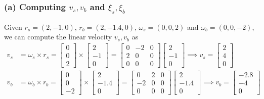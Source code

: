\subsubsection*{(a) Computing \( v_{s}, v_{b} \) and \( \xi_{s}, \xi_{b} \)}

Given \( r_{s}=(2,-1,0) \), \( r_{b}=(2,-1.4,0) \), \( \omega_{s}=(0,0,2) \) and \( \omega_{b}=(0,0,-2) \), we can compute the linear velocity \( v_{s}, v_{b} \) as
\begin{align*}
    v_{s}
     & =
    \omega_{s} \times r_{s}
    =
    \begin{bmatrix}
        0 \\
        0 \\
        2
    \end{bmatrix}
    \times
    \begin{bmatrix}
        2  \\
        -1 \\
        0
    \end{bmatrix}
    =
    \begin{bmatrix}
        0 & -2 & 0 \\
        2 & 0  & 0 \\
        0 & 0  & 0
    \end{bmatrix}
    \begin{bmatrix}
        2  \\
        -1 \\
        0
    \end{bmatrix}
    \implies
    \boxed{
        v_{s}
        =
        \begin{bmatrix}
            2 \\
            4 \\
            0
        \end{bmatrix}
    }
    \\
    v_{b}
     & =
    \omega_{b} \times r_{b}
    =
    \begin{bmatrix}
        0 \\
        0 \\
        -2
    \end{bmatrix}
    \times
    \begin{bmatrix}
        2    \\
        -1.4 \\
        0
    \end{bmatrix}
    =
    \begin{bmatrix}
        0  & 2 & 0 \\
        -2 & 0 & 0 \\
        0  & 0 & 0
    \end{bmatrix}
    \begin{bmatrix}
        2    \\
        -1.4 \\
        0
    \end{bmatrix}
    \implies
    \boxed{
        v_{b}
        =
        \begin{bmatrix}
            -2.8 \\
            -4   \\
            0
        \end{bmatrix}
    }
\end{align*}
